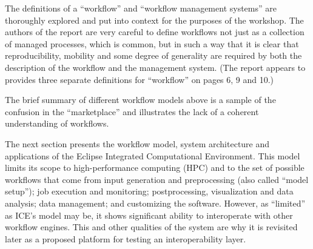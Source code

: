 The definitions of a ``workflow'' and ``workflow management systems''
are thoroughly explored and put into context for the purposes of the
workshop. The authors of the report are very careful to define workflows
not just as a collection of managed processes, which is common, but in
such a way that it is clear that reproducibility, mobility and some
degree of generality are required by both the description of the
workflow and the management system. (The report appears to provides
three separate definitions for ``workflow'' on pages 6, 9 and 10.)

The brief summary of different workflow models above is a sample of the
confusion in the ``marketplace'' and illustrates the lack of a coherent
understanding of workflows.

The next section presents the workflow model, system architecture and
applications of the Eclipse Integrated Computational Environment. This
model limits its scope to high-performance computing (HPC) and to the
set of possible workflows that come from input generation and
preprocessing (also called ``model setup''); job execution and
monitoring; postprocessing, visualization and data analysis; data
management; and customizing the software. However, as ``limited'' as
ICE's model may be, it shows significant ability to interoperate with
other workflow engines. This and other qualities of the system are why
it is revisited later as a proposed platform for testing an
interoperability layer.


